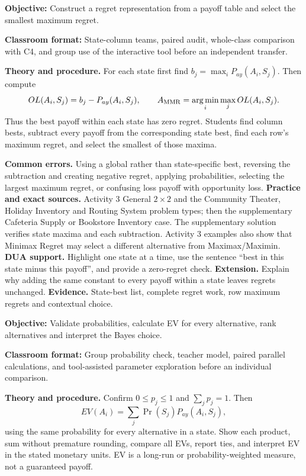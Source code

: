 \documentclass[10pt,letterpaper]{article}
\newcommand{\labelled}[2]{\textbf{#1:} #2\par}
\newcommand{\partheading}[1]{\Needspace{7\baselineskip}\par\vspace{4pt}{\bfseries #1\par}}
\begin{document}
\partheading{Part 1---C5: Opportunity Loss and Minimax Regret}
\labelled{Objective}{Construct a regret representation from a payoff table and select the smallest maximum regret.}
\labelled{Classroom format}{State-column teams, paired audit, whole-class comparison with C4, and group use of the interactive tool before an independent transfer.}
\textbf{Theory and procedure.} For each state first find
$b_j=\max_iP_{ay}(A_i,S_j)$. Then compute
\[
OL(A_i,S_j)=b_j-P_{ay}(A_i,S_j),\qquad
A_{\rm MMR}=\operatorname*{arg\,min}_i\max_jOL(A_i,S_j).
\]
Thus the best payoff within each state has zero regret. Students find column
bests, subtract every payoff from the corresponding state best, find each
row's maximum regret, and select the smallest of those maxima.

\textbf{Common errors.} Using a global rather than state-specific best,
reversing the subtraction and creating negative regret, applying probabilities,
selecting the largest maximum regret, or confusing loss payoff with opportunity
loss. \textbf{Practice and exact sources.} Activity 3 General $2\times2$ and
the Community Theater, Holiday Inventory and Routing System problem types;
then the supplementary Cafeteria Supply or Bookstore Inventory case. The
supplementary solution verifies state maxima and each subtraction. Activity 3
examples also show that Minimax Regret may select a different alternative from
Maximax/Maximin. \textbf{DUA support.} Highlight one state at a time, use the
sentence ``best in this state minus this payoff'', and provide a zero-regret
check. \textbf{Extension.} Explain why adding the same constant to every payoff
within a state leaves regrets unchanged. \textbf{Evidence.} State-best list,
complete regret work, row maximum regrets and contextual choice.

\partheading{Part 2---C6: Expected Monetary Value and Bayes Choice}
\labelled{Objective}{Validate probabilities, calculate EV for every alternative, rank alternatives and interpret the Bayes choice.}
\labelled{Classroom format}{Group probability check, teacher model, paired parallel calculations, and tool-assisted parameter exploration before an individual comparison.}
\textbf{Theory and procedure.} Confirm $0\leq p_j\leq1$ and
$\sum_jp_j=1$. Then
\[
EV(A_i)=\sum_j\Pr(S_j)P_{ay}(A_i,S_j),
\]
using the same probability for every alternative in a state. Show each product,
sum without premature rounding, compare all EVs, report ties, and interpret EV
in the stated monetary units. EV is a long-run or probability-weighted measure,
not a guaranteed payoff.
\end{document}
